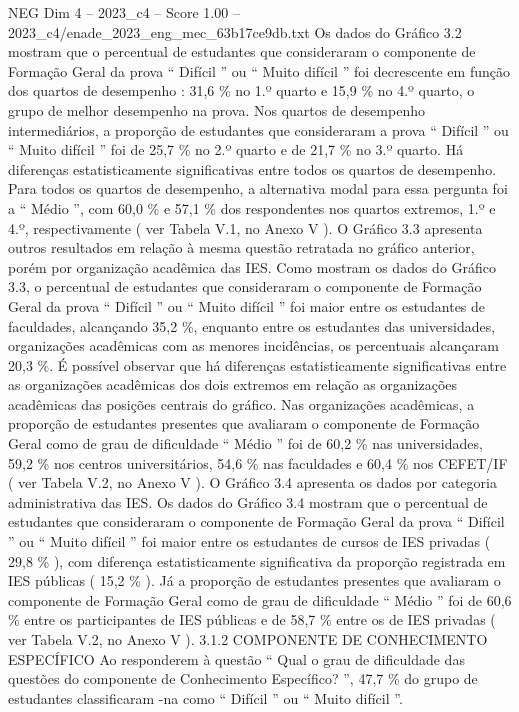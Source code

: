 \begin{textsample}{NEG Dim 4 – 2023\_c4 – Score 1.00 – 2023\_c4/enade\_2023\_eng\_mec\_63b17ce9db.txt}
Os dados do Gráfico 3.2 mostram que o percentual de estudantes que consideraram o componente de Formação Geral da prova “ Difícil ” ou “ Muito difícil ” foi decrescente em função dos quartos de desempenho : 31,6 \% no 1.º quarto e 15,9 \% no 4.º quarto, o grupo de melhor desempenho na prova.
Nos quartos de desempenho intermediários, a proporção de estudantes que consideraram a prova “ Difícil ” ou “ Muito difícil ” foi de 25,7 \% no 2.º quarto e de 21,7 \% no 3.º quarto.
Há diferenças estatisticamente significativas entre todos os quartos de desempenho.
Para todos os quartos de desempenho, a alternativa modal para essa pergunta foi a “ Médio ”, com 60,0 \% e 57,1 \% dos respondentes nos quartos extremos, 1.º e 4.º, respectivamente ( ver Tabela V.1, no Anexo V ).
O Gráfico 3.3 apresenta outros resultados em relação à mesma questão retratada no gráfico anterior, porém por organização acadêmica das IES.
Como mostram os dados do Gráfico 3.3, o percentual de estudantes que consideraram o componente de Formação Geral da prova “ Difícil ” ou “ Muito difícil ” foi maior entre os estudantes de faculdades, alcançando 35,2 \%, enquanto entre os estudantes das universidades, organizações acadêmicas com as menores incidências, os percentuais alcançaram 20,3 \%.
É possível observar que há diferenças estatisticamente significativas entre as organizações acadêmicas dos dois extremos em relação as organizações acadêmicas das posições centrais do gráfico.
Nas organizações acadêmicas, a proporção de estudantes presentes que avaliaram o componente de Formação Geral como de grau de dificuldade “ Médio ” foi de 60,2 \% nas universidades, 59,2 \% nos centros universitários, 54,6 \% nas faculdades e 60,4 \% nos CEFET/IF ( ver Tabela V.2, no Anexo V ).
O Gráfico 3.4 apresenta os dados por categoria administrativa das IES.
Os dados do Gráfico 3.4 mostram que o percentual de estudantes que consideraram o componente de Formação Geral da prova “ Difícil ” ou “ Muito difícil ” foi maior entre os estudantes de cursos de IES privadas ( 29,8 \% ), com diferença estatisticamente significativa da proporção registrada em IES públicas ( 15,2 \% ).
Já a proporção de estudantes presentes que avaliaram o componente de Formação Geral como de grau de dificuldade “ Médio ” foi de 60,6 \% entre os participantes de IES públicas e de 58,7 \% entre os de IES privadas ( ver Tabela V.2, no Anexo V ). 3.1.2 COMPONENTE DE CONHECIMENTO ESPECÍFICO Ao responderem à questão “ Qual o grau de dificuldade das questões do componente de Conhecimento Específico? ”, 47,7 \% do grupo de estudantes classificaram -na como “ Difícil ” ou “ Muito difícil ”.

\end{textsample}
